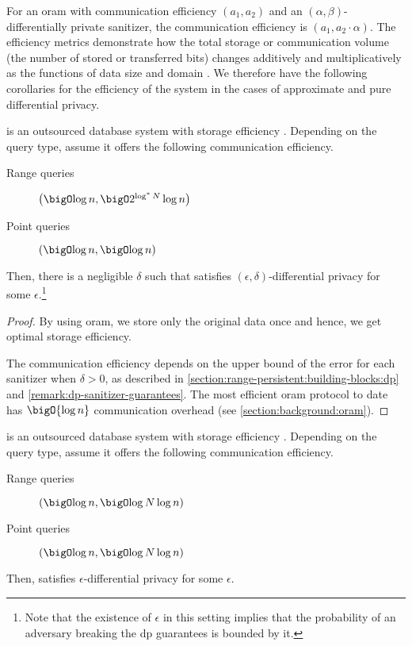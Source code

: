 		For an \acrshort{oram} with communication efficiency $(a_1, a_2)$ and an $(\alpha, \beta)$-differentially private sanitizer, the \epsolute{} communication efficiency is $(a_1, a_2 \cdot \alpha)$.
		The efficiency metrics demonstrate how the total storage or communication volume (the number of stored or transferred bits) changes additively and multiplicatively as the functions of data size \dataSize{} and domain \domainSize{}.
		We therefore have the following corollaries for the efficiency of the system in the cases of approximate and pure differential privacy.
		\begin{corollary}\label{corollary:comm-efficiency-approximate-dp}
			\epsolute{} is an outsourced database system with storage efficiency .
			Depending on the query type, assume it offers the following communication efficiency.
			\begin{description}
				\item[Range queries] $\efficiency{\log \dataSize}{2^{\log^* \domainSize} \log \dataSize}$
				\item[Point queries] $\efficiency{\log \dataSize}{\log \dataSize}$
			\end{description}
			Then, there is a negligible $\delta$ such that \epsolute{} satisfies $(\epsilon, \delta)$\hyp{}differential privacy for some $\epsilon$.\footnote{
				Note that the existence of $\epsilon$ in this setting implies that the probability of an adversary breaking the \acrshort{dp} guarantees is bounded by it.
			}
		\end{corollary}

		\begin{proof}
			By using \acrshort{oram}, we store only the original data once and hence, we get optimal storage efficiency.

			The communication efficiency depends on the upper bound of the error for each sanitizer when $\delta > 0$, as described in \cref{section:range-persistent:building-blocks:dp} and \cref{remark:dp-sanitizer-guarantees}.
			The most efficient \acrshort{oram} protocol to date has $\bigO{\log \dataSize}$ communication overhead (see \cref{section:background:oram}).
		\end{proof}

		\begin{corollary}\label{corollary:comm-efficiency-pure-dp}
			\epsolute{} is an outsourced database system with storage efficiency .
			Depending on the query type, assume it offers the following communication efficiency.
			\begin{description}
				\item[Range queries] $\efficiency{\log \dataSize}{\log \domainSize \log \dataSize}$
				\item[Point queries] $\efficiency{\log \dataSize}{\log \domainSize \log \dataSize}$
			\end{description}
			Then, \epsolute{} satisfies $\epsilon$-differential privacy for some $\epsilon$.
		\end{corollary}

